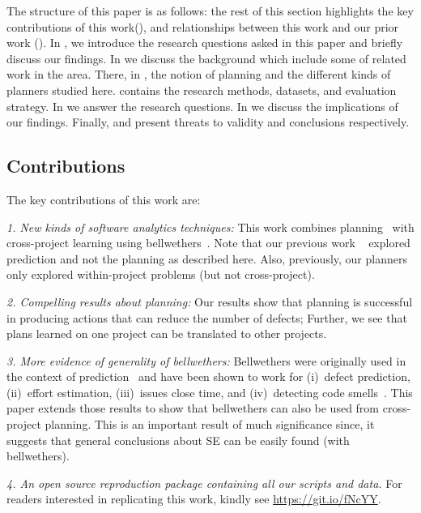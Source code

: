 The structure of this paper is as follows: the rest of this section highlights the key contributions of this work(), and relationships between this work and our prior work (). In , we introduce the research questions asked in this paper and briefly discuss our findings. In  we discuss the background which include some of related work in the area. There, in , the  notion of planning and the different kinds of planners studied here.  contains the research methods, datasets, and evaluation strategy. In  we answer the research questions. In  we discuss the implications of our findings. Finally,  and  present threats to validity and conclusions respectively.


\subsection{Contributions}
\label{sect:contrib}
The key contributions of this work are:

\textit{1. New kinds of software analytics techniques:} This work combines planning~\citep{krishna17a} with cross-project learning using bellwethers~\citep{krishna16}. 
Note that
our previous work ~\citep{krishna16, krishna17b} explored prediction and not the planning as described here. Also, previously, our planners~\citep{krishna17a} only explored within-project problems (but not cross-project). 

\textit{2. Compelling results about planning:} Our results show that planning is  successful in producing actions that can reduce the number of defects; Further, we see that plans learned on one project can be translated to other projects.

\textit{3. More evidence of generality of bellwethers:}  Bellwethers were
originally  used in the context of prediction~\citep{krishna16} and have been shown to work for (i)~defect prediction, (ii)~effort estimation, (iii)~issues close time, and (iv)~detecting code smells~\citep{krishna17b}. This paper extends those results to show that bellwethers can also be used from cross-project planning. This is an important result of much significance since, it suggests that general conclusions about SE can be easily found (with bellwethers).

\textit{4. An open source reproduction package containing all our scripts and data.} For readers interested in replicating this work, kindly see \url{https://git.io/fNcYY}.
 

